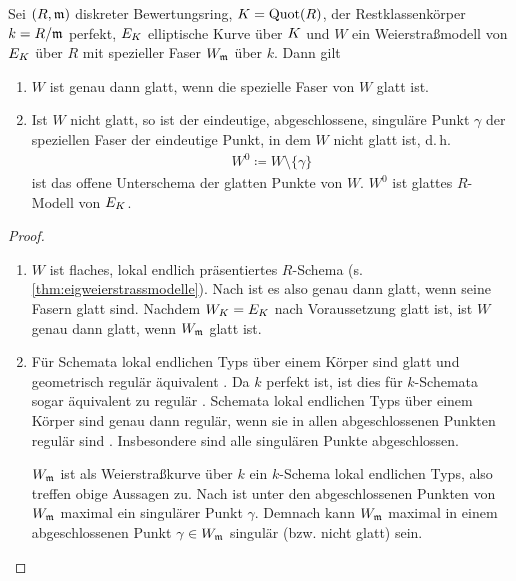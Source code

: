 \begin{Lemma}\label{thm:weierstrassglatt}
  Sei $(R,\mathfrak{m})$ diskreter Bewertungsring,
  $K=\operatorname{Quot}(R)$,
  der Restklassenkörper $k=R/\mathfrak{m}$ perfekt,
  $E_{K}$ elliptische Kurve über $K$ und
  $W$ ein Weierstraßmodell von $E_{K}$ über $R$
  mit spezieller Faser $W_{\mathfrak{m}}$ über $k$.
  Dann gilt
  \begin{enumerate}[label=(\alph*)]
  \item $W$ ist genau dann glatt, wenn die spezielle Faser von $W$ glatt
    ist.
  \item Ist $W$ nicht glatt, so ist der eindeutige, abgeschlossene,
    singuläre Punkt $\gamma$ der speziellen Faser der eindeutige
    Punkt, in dem $W$ nicht glatt ist, d.\,h.
    \begin{gather*}
      W^0\coloneqq W\setminus \{\gamma\}
    \end{gather*}
    ist das offene Unterschema der glatten Punkte von $W$.
    $W^0$ ist glattes $R$-Modell von $E_{K}$.
  \end{enumerate}
  \begin{proof}
    \begin{enumerate}[label=(\alph*)]
    \item $W$ ist flaches, lokal endlich präsentiertes
      $R$-Schema (s. \ref{thm:eigweierstrassmodelle}).
      Nach \cite[8.5, Proposition 17]{bosch} ist es also genau dann
      glatt, wenn seine Fasern glatt sind.
      Nachdem $W_{K}=E_{K}$ nach Voraussetzung glatt ist, ist $W$ genau
      dann glatt, wenn $W_{\mathfrak{m}}$ glatt ist.
    \item Für Schemata lokal endlichen Typs über einem Körper sind
      glatt und geometrisch regulär äquivalent
      \cite[Corollary 6.32]{wedhorn}.
      Da $k$ perfekt ist, ist dies für $k$-Schemata sogar
      äquivalent zu regulär
      \cite[Remark 6.33]{wedhorn}.
      Schemata lokal endlichen Typs über einem Körper sind genau dann
      regulär, wenn sie in allen abgeschlossenen Punkten regulär sind
      \cite[Remark 6.25 (3)]{wedhorn}. Insbesondere sind alle
      singulären Punkte abgeschlossen.

      $W_{\mathfrak{m}}$ ist als Weierstraßkurve über $k$ ein $k$-Schema
      lokal endlichen Typs, also treffen obige Aussagen zu.
      Nach \cite[Proposition III.1.4]{silverman} ist unter den
      abgeschlossenen Punkten von $W_{\mathfrak{m}}$ maximal ein singulärer Punkt
      $\gamma$. Demnach kann $W_{\mathfrak{m}}$ maximal in einem abgeschlossenen
      Punkt $\gamma\in W_{\mathfrak{m}}$ singulär (bzw. nicht glatt) sein.


\end{enumerate}
\end{proof}
\end{Lemma}
